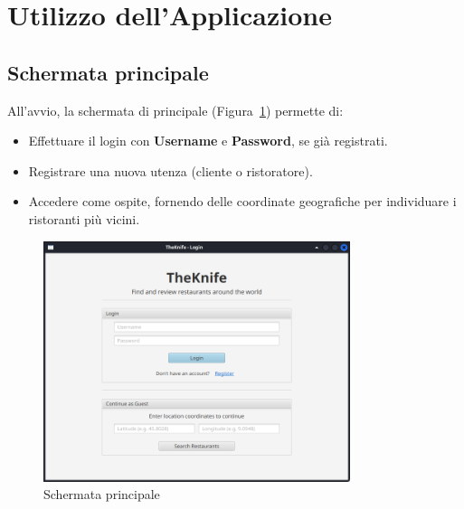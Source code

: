 \section{Utilizzo dell'Applicazione}
\label{cap:utilizzo}
\subsection{Schermata principale}
All'avvio, la schermata di principale (Figura~\ref{fig:login}) permette di:
\begin{itemize}
    \item Effettuare il login con \textbf{Username} e \textbf{Password}, se già registrati.
    \item Registrare una nuova utenza (cliente o ristoratore).
    \item Accedere come ospite, fornendo delle coordinate geografiche per individuare i ristoranti più vicini.
\end{itemize}

\begin{figure}[H]
    \centering
    \includegraphics[width=0.8\textwidth]{images/login.png}
    \caption{Schermata principale}
    \label{fig:login}
\end{figure}

